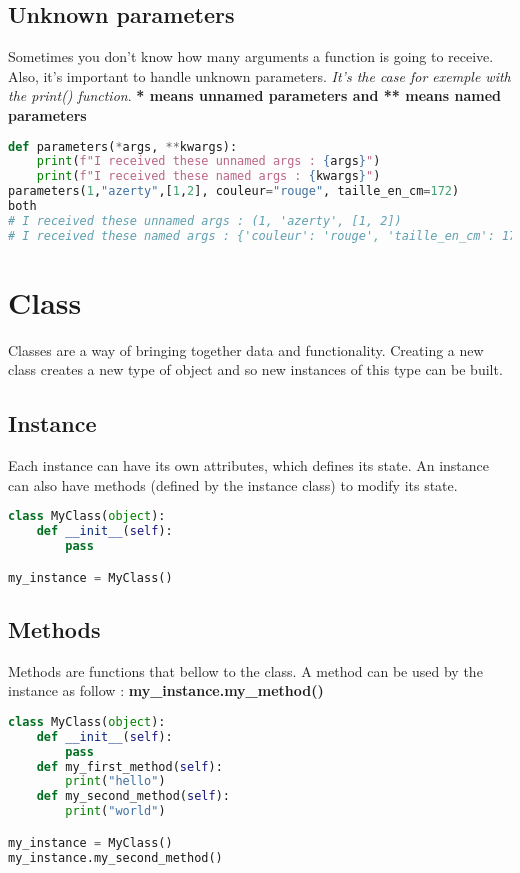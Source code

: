 \documentclass[a4paper, 12pt, titlepage]{scrartcl} %
\begin{document}
\subsection{Unknown parameters}
Sometimes you don't know how many arguments a function is going to receive. Also, it's important to handle unknown parameters. \textit{It's the case for exemple with the print() function}. \textbf{* means unnamed parameters and ** means named parameters}
\begin{lstlisting}[language=Python]
def parameters(*args, **kwargs):
	print(f"I received these unnamed args : {args}")
	print(f"I received these named args : {kwargs}")
parameters(1,"azerty",[1,2], couleur="rouge", taille_en_cm=172)
both
# I received these unnamed args : (1, 'azerty', [1, 2])
# I received these named args : {'couleur': 'rouge', 'taille_en_cm': 172}
\end{lstlisting}

\newpage
\section{Class}
\label{sec:Class}
Classes are a way of bringing together data and functionality. Creating a new class creates a new type of object and so new instances of this type can be built.\newline

\subsection{Instance}
Each instance can have its own attributes, which defines its state. An instance can also have methods (defined by the instance class) to modify its state.
\begin{lstlisting}[language=Python]
class MyClass(object):
	def __init__(self):
		pass

my_instance = MyClass()
\end{lstlisting}

\subsection{Methods}
Methods are functions that bellow to the class. A method can be used by the instance as follow  : \textbf{my\_instance.my\_method()}
\begin{lstlisting}[language=Python]
class MyClass(object):
	def __init__(self):
		pass
	def my_first_method(self):
	    print("hello")
	def my_second_method(self):
	    print("world")

my_instance = MyClass()
my_instance.my_second_method()
\end{lstlisting}
\end{document}
